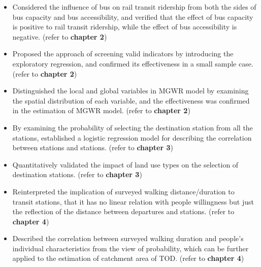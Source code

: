 \begin{itemize}
	\item Considered the influence of bus on rail transit ridership from both the sides of bus capacity and bus accessibility, and verified that the effect of bus capacity is positive to rail transit ridership, while the effect of bus accessibility is negative. (refer to \textbf{chapter 2})
	
	\item Proposed the approach of screening valid indicators by introducing the exploratory regression, and confirmed its effectiveness in a small sample case. (refer to \textbf{chapter 2})
	
	\item Distinguished the local and global variables in MGWR model by examining the spatial distribution of each variable, and the effectiveness was confirmed in the estimation of MGWR model. (refer to \textbf{chapter 2})
	
	\item By examining the probability of selecting the destination station from all the stations, established a logistic regression model for describing the correlation between stations and stations. (refer to \textbf{chapter 3})
	
	\item Quantitatively validated the impact of land use types on the selection of destination stations. (refer to \textbf{chapter 3})
	
	\item Reinterpreted the implication of surveyed walking distance/duration to transit stations, that it has no linear relation with people willingness but just the reflection of the distance between departures and stations. (refer to \textbf{chapter 4})
	
	\item Described the correlation between surveyed walking duration and people's individual characteristics from the view of probability, which can be further applied to the estimation of catchment area of TOD. (refer to \textbf{chapter 4})
	
\end{itemize} 


